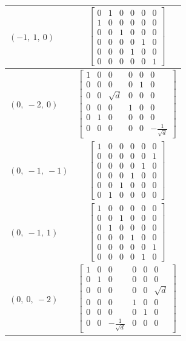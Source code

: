 \documentclass[11pt]{article}
\theoremstyle{definition}
\begin{document}
\begin{longtable}{|l|c|}
    \hline
    $\left( -1, \  1, \  0\right)$ & ${\left[\begin{matrix}0 & 1 & 0 & 0 & 0 & 0\\1 & 0 & 0 & 0 & 0 & 0\\0 & 0 & 1 & 0 & 0 & 0\\0 & 0 & 0 & 0 & 1 & 0\\0 & 0 & 0 & 1 & 0 & 0\\0 & 0 & 0 & 0 & 0 & 1\end{matrix}\right]}$ \\
    \hline
    $\left( 0, \  -2, \  0\right)$ & ${\left[\begin{matrix}1 & 0 & 0 & 0 & 0 & 0\\0 & 0 & 0 & 0 & 1 & 0\\0 & 0 & \sqrt{d} & 0 & 0 & 0\\0 & 0 & 0 & 1 & 0 & 0\\0 & 1 & 0 & 0 & 0 & 0\\0 & 0 & 0 & 0 & 0 & - \frac{1}{\sqrt{d}}\end{matrix}\right]}$ \\
    \hline
    $\left( 0, \  -1, \  -1\right)$ & ${\left[\begin{matrix}1 & 0 & 0 & 0 & 0 & 0\\0 & 0 & 0 & 0 & 0 & 1\\0 & 0 & 0 & 0 & 1 & 0\\0 & 0 & 0 & 1 & 0 & 0\\0 & 0 & 1 & 0 & 0 & 0\\0 & 1 & 0 & 0 & 0 & 0\end{matrix}\right]}$ \\
    \hline
    $\left( 0, \  -1, \  1\right)$ & ${\left[\begin{matrix}1 & 0 & 0 & 0 & 0 & 0\\0 & 0 & 1 & 0 & 0 & 0\\0 & 1 & 0 & 0 & 0 & 0\\0 & 0 & 0 & 1 & 0 & 0\\0 & 0 & 0 & 0 & 0 & 1\\0 & 0 & 0 & 0 & 1 & 0\end{matrix}\right]}$ \\
    \hline
    $\left( 0, \  0, \  -2\right)$ & ${\left[\begin{matrix}1 & 0 & 0 & 0 & 0 & 0\\0 & 1 & 0 & 0 & 0 & 0\\0 & 0 & 0 & 0 & 0 & \sqrt{d}\\0 & 0 & 0 & 1 & 0 & 0\\0 & 0 & 0 & 0 & 1 & 0\\0 & 0 & - \frac{1}{\sqrt{d}} & 0 & 0 & 0\end{matrix}\right]}$ \\

\end{longtable}
\end{document}
